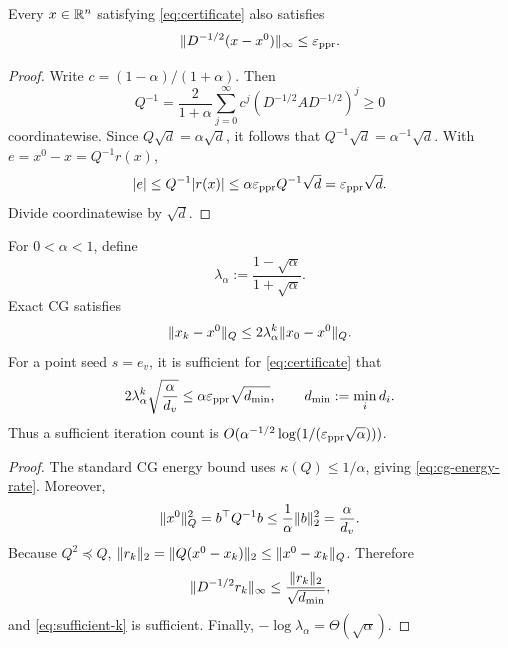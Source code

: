 \documentclass[11pt]{article}
\begin{document}
\begin{lemma}
\label{lem:certificate}
Every $x\in\mathbb{R}^n$ satisfying \cref{eq:certificate} also satisfies
\begin{equation}
 \lVert D^{-1/2}(x-x^0)\rVert_\infty\leq\varepsilon_{\mathrm{ppr}}.
 \label{eq:error-certificate}
\end{equation}
\end{lemma}

\begin{proof}
Write $c=(1-\alpha)/(1+\alpha)$. Then
\begin{equation*}
 Q^{-1}=\frac{2}{1+\alpha}\sum_{j=0}^\infty
 c^j\left(D^{-1/2}AD^{-1/2}\right)^j\geq0
\end{equation*}
coordinatewise. Since $Q\sqrt d=\alpha\sqrt d$, it follows that
$Q^{-1}\sqrt d=\alpha^{-1}\sqrt d$. With $e=x^0-x=Q^{-1}r(x)$,
\begin{equation*}
 |e|\leq Q^{-1}|r(x)|
 \leq\alpha\varepsilon_{\mathrm{ppr}} Q^{-1}\sqrt d
 =\varepsilon_{\mathrm{ppr}}\sqrt d.
\end{equation*}
Divide coordinatewise by $\sqrt d$.
\end{proof}

\begin{proposition}
\label{prop:cg-rate}
For $0<\alpha<1$, define
\begin{equation}
 \lambda_\alpha:=\frac{1-\sqrt\alpha}{1+\sqrt\alpha}.
\end{equation}
Exact CG satisfies
\begin{equation}
 \lVert x_k-x^0\rVert_Q
 \leq2\lambda_\alpha^k\lVert x_0-x^0\rVert_Q.
 \label{eq:cg-energy-rate}
\end{equation}
For a point seed $s=e_v$, it is sufficient for \cref{eq:certificate} that
\begin{equation}
 2\lambda_\alpha^k\sqrt{\frac{\alpha}{d_v}}
 \leq\alpha\varepsilon_{\mathrm{ppr}}\sqrt{d_{\min}},
 \qquad d_{\min}:=\min_i d_i.
 \label{eq:sufficient-k}
\end{equation}
Thus a sufficient iteration count is
$O(\alpha^{-1/2}\log(1/(\varepsilon_{\mathrm{ppr}}\sqrt\alpha)))$.
\end{proposition}

\begin{proof}
The standard CG energy bound uses
$\kappa(Q)\leq1/\alpha$, giving \cref{eq:cg-energy-rate}. Moreover,
\begin{equation*}
 \lVert x^0\rVert_Q^2=b^\top Q^{-1}b
 \leq\frac{1}{\alpha}\lVert b\rVert_2^2
 =\frac{\alpha}{d_v}.
\end{equation*}
Because $Q^2\preceq Q$,
$\lVert r_k\rVert_2=\lVert Q(x^0-x_k)\rVert_2\leq\lVert x^0-x_k\rVert_Q$. Therefore
\begin{equation*}
 \lVert D^{-1/2}r_k\rVert_\infty
 \leq\frac{\lVert r_k\rVert_2}{\sqrt{d_{\min}}},
\end{equation*}
and \cref{eq:sufficient-k} is sufficient. Finally,
$-\log\lambda_\alpha=\Theta(\sqrt\alpha)$.
\end{proof}
\end{document}
